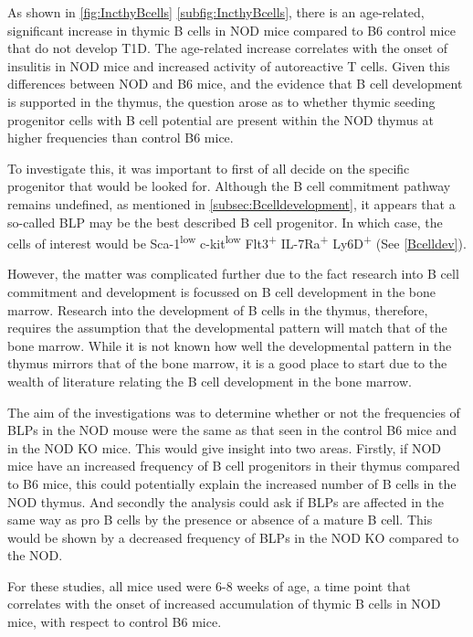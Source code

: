 As shown in \cref{fig:IncthyBcells} \ref{subfig:IncthyBcells}, there is an age-related, significant increase in thymic B cells in NOD mice compared to B6 control mice that do not develop T1D.
The age-related increase correlates with the onset of insulitis in NOD mice and increased activity of autoreactive T cells.
Given this differences between NOD and B6 mice, and the evidence that B cell development is supported in the thymus, the question arose as to whether thymic seeding progenitor cells with B cell potential are present within the NOD thymus at higher frequencies than control B6 mice.

To investigate this, it was important to first of all decide on the specific progenitor that would be looked for.
Although the B cell commitment pathway remains undefined, as mentioned in \cref{subsec:Bcelldevelopment}, it appears that a so-called BLP may be the best described B cell progenitor.
In which case, the cells of interest would be Sca-1\textsuperscript{low} c-kit\textsuperscript{low} Flt3\textsuperscript{+} IL-7Ra\textsuperscript{+} Ly6D\textsuperscript{+} \citep{Mansson2010, Inlay2009, Zhang2013} (See \cref{Bcelldev}).

However, the matter was complicated further due to the fact research into B cell commitment and development is focussed on B cell development in the bone marrow.
Research into the development of B cells in the thymus, therefore, requires the assumption that the developmental pattern will match that of the bone marrow.
While it is not known how well the developmental pattern in the thymus mirrors that of the bone marrow, it is a good place to start due to the wealth of literature relating the B cell development in the bone marrow.

The aim of the investigations was to determine whether or not the frequencies of BLPs in the NOD mouse were the same as that seen in the control B6 mice and in the NOD KO mice.
This would give insight into two areas.
Firstly, if NOD mice have an increased frequency of B cell progenitors in their thymus compared to B6 mice, this could potentially explain the increased number of B cells in the NOD thymus.
And secondly the analysis could ask if BLPs are affected in the same way as pro B cells by the presence or absence of a mature B cell.
This would be shown by a decreased frequency of BLPs in the NOD KO compared to the NOD.

For these studies, all mice used were 6-8 weeks of age, a time point that correlates with the onset of increased accumulation of thymic B cells in NOD mice, with respect to control B6 mice.



